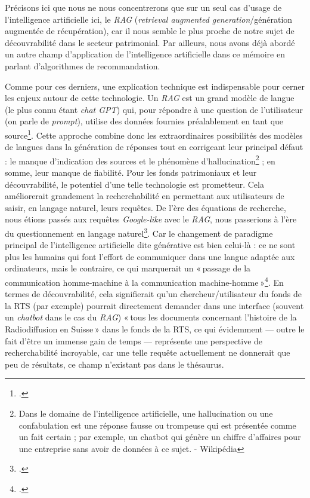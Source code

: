 Précisons ici que nous ne nous concentrerons que sur un seul cas d’usage de l’intelligence artificielle ici, le \textit{RAG} (\textit{retrieval augmented generation}/génération augmentée de récupération), car il nous semble le plus proche de notre sujet de découvrabilité dans le secteur patrimonial. Par ailleurs, nous avons déjà abordé un autre champ d’application de l’intelligence artificielle dans ce mémoire en parlant d’algorithmes de recommandation.

Comme pour ces derniers, une explication technique est indispensable pour cerner les enjeux autour de cette technologie. Un \textit{RAG} est un grand modèle de langue (le plus connu étant \textit{chat GPT}) qui, pour répondre à une question de l’utilisateur (on parle de \textit{prompt}), utilise des données fournies préalablement en tant que source\footcite{pouyllau_quels_2024}. Cette approche combine donc les extraordinaires possibilités des modèles de langues dans la génération de réponses tout en corrigeant leur principal défaut : le manque d’indication des sources et le phénomène d’hallucination\footnote{Dans le domaine de l'intelligence artificielle, une hallucination ou une confabulation est une réponse fausse ou trompeuse qui est présentée comme un fait certain ; par exemple, un chatbot qui génère un chiffre d'affaires pour une entreprise sans avoir de données à ce sujet. - Wikipédia} ; en somme, leur manque de fiabilité. Pour les fonds patrimoniaux et leur découvrabilité, le potentiel d’une telle technologie est prometteur. Cela améliorerait grandement la recherchabilité en permettant aux utilisateurs de saisir, en langage naturel, leurs requêtes. De l’ère des équations de recherche, nous étions passés aux requêtes \textit{Google-like} avec le \textit{RAG}, nous passerions à l’ère du questionnement en langage naturel\footcite{bermes_futur_2024}. Car le changement de paradigme principal de l’intelligence artificielle dite générative est bien celui-là : ce ne sont plus les humains qui font l’effort de communiquer dans une langue adaptée aux ordinateurs, mais le contraire, ce qui marquerait un « passage de la communication homme-machine à la communication machine-homme »\footcite[p. 7]{pillaud_et_2024}. En termes de découvrabilité, cela signifierait qu’un chercheur/utilisateur du fonds de la RTS (par exemple) pourrait directement demander dans une interface (souvent un \textit{chatbot} dans le cas du \textit{RAG}) « tous les documents concernant l’histoire de la Radiodiffusion en Suisse » dans le fonds de la RTS, ce qui évidemment — outre le fait d’être un immense gain de temps — représente une perspective de recherchabilité incroyable, car une telle requête actuellement ne donnerait que peu de résultats, ce champ n’existant pas dans le thésaurus.


